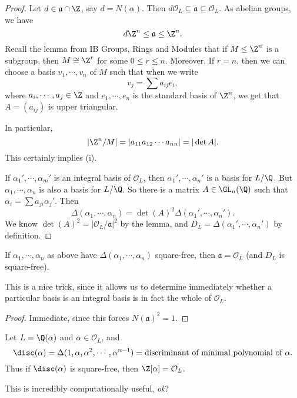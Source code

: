 \documentclass[a4paper]{article}
\begin{document}
\begin{proof}
  Let $d \in \mathfrak{a} \cap \Z$, say $d = N(\alpha)$. Then $d \mathcal{O}_L \subseteq \mathfrak{a} \subseteq \mathcal{O}_L$. As abelian groups, we have
  \[
    d \Z^n \leq \mathfrak{a} \leq \Z^n.
  \]
  Recall the lemma from IB Groups, Rings and Modules that if $M \leq \Z^n$ is a subgroup, then $M \cong \Z^r$ for some $0 \leq r \leq n$. Moreover, If $r = n$, then we can choose a basis $v_1, \cdots, v_n$ of $M$ such that when we write
  \[
    v_j = \sum a_{ij} e_i,
  \]
  where $a_i, \cdots, a_j \in \Z$ and $e_1, \cdots, e_n$ is the standard basis of $\Z^n$, we get that $A = (a_{ij})$ is upper triangular.

  In particular,
  \[
    |\Z^n/M| = |a_{11} a_{12} \cdots a_{nn}| = |\det A|.
  \]
  This certainly implies (i).

  If $\alpha_1', \cdots, \alpha_m'$ is an integral basis of $\mathcal{O}_L$, then $\alpha_1', \cdots, \alpha_n'$ is a basis for $L/\Q$. But $\alpha_1, \cdots, \alpha_n$ is also a basis for $L/\Q$. So there is a matrix $A \in \GL_n(\Q)$ such that $\alpha_i = \sum a_{ji} \alpha_j'$. Then
  \[
    \Delta(\alpha_1, \cdots, \alpha_n) = \det(A)^2 \Delta(\alpha_1', \cdots, \alpha_n').
  \]
  We know $\det(A)^2 = |\mathcal{O}_L/\mathfrak{a}|^2$ by the lemma, and $D_L = \Delta(\alpha_1', \cdots, \alpha_n')$ by definition.
\end{proof}

\begin{cor}
  If $\alpha_1, \cdots, \alpha_n$ as above have $\Delta(\alpha_1, \cdots, \alpha_n)$ square-free, then $\mathfrak{a} = \mathcal{O}_L$ (and $D_L$ is square-free).
\end{cor}
This is a nice trick, since it allows us to determine immediately whether a particular basis is an integral basis is in fact the whole of $\mathcal{O}_L$.

\begin{proof}
  Immediate, since this forces $N(\mathfrak{a})^2 = 1$.
\end{proof}

\begin{eg}
  Let $L = \Q(\alpha)$ and $\alpha \in \mathcal{O}_L$, and
  \[
    \disc(\alpha) = \Delta(1, \alpha, \alpha^2, \cdots, \alpha^{n - 1}) = \text{discriminant of minimal polynomial of }\alpha.
  \]
  Thus if $\disc(\alpha)$ is square-free, then $\Z[\alpha] = \mathcal{O}_L$.
\end{eg}
This is incredibly computationally useful, \emph{ok}?
\end{document}
